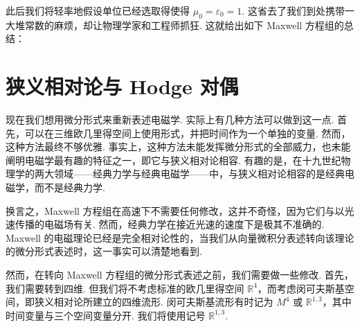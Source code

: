 此后我们将轻率地假设单位已经选取得使得 $\mu_0=\varepsilon_0=1$. 这省去了我们到处携带一大堆常数的麻烦，却让物理学家和工程师抓狂. 这就给出如下 Maxwell 方程组的总结：

\begin{center}
\end{center}

\section{狭义相对论与 Hodge 对偶}

现在我们想用微分形式来重新表述电磁学. 实际上有几种方法可以做到这一点. 首先，可以在三维欧几里得空间上使用形式，并把时间作为一个单独的变量. 然而，这种方法最终不够优雅. 事实上，这种方法未能发挥微分形式的全部威力，也未能阐明电磁学最有趣的特征之一，即它与狭义相对论相容. 有趣的是，在十九世纪物理学的两大领域——经典力学与经典电磁学——中，与狭义相对论相容的是经典电磁学，而不是经典力学.

换言之，Maxwell 方程组在高速下不需要任何修改，这并不奇怪，因为它们与以光速传播的电磁场有关. 然而，经典力学在接近光速的速度下是极其不准确的. Maxwell 的电磁理论已经是完全相对论性的，当我们从向量微积分表述转向该理论的微分形式表述时，这一事实可以清楚地看到.

然而，在转向 Maxwell 方程组的微分形式表述之前，我们需要做一些修改. 首先，我们需要转到四维. 但我们将不考虑标准的欧几里得空间 $\mathbb{R}^4$，而考虑闵可夫斯基空间，即狭义相对论所建立的四维流形. 闵可夫斯基流形有时记为 $M^4$ 或 $\mathbb{R}^{1,3}$，其中时间变量与三个空间变量分开. 我们将使用记号 $\mathbb{R}^{1,3}$.


